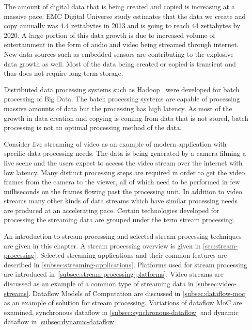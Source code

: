 The amount of digital data that is being created and copied is increasing at a massive pace. EMC Digital Universe study \cite{turner2014digital} estimates that the data we create and copy annually was 4.4 zettabytes in 2013 and is going to reach 44 zettabytes by 2020. A large portion of this data growth is due to increased volume of entertainment in the form of audio and video being streamed through internet. New data sources such as embedded sensors are contributing to the explosive data growth as well. Most of the data being created or copied is transient and thus does not require long term storage.~\cite{turner2014digital}

Distributed data processing systems such as Hadoop~\cite{white2012hadoop} were developed for batch processing of Big Data. The batch processing systems are capable of processing massive amounts of data but the processing has high latency. As most of the growth in data creation and copying is coming from data that is not stored, batch processing is not an optimal processing method of the data.

Consider live streaming of video as an example of modern application with specific data processing needs. The data is being generated by a camera filming a live scene and the users expect to access the video stream over the internet with low latency. Many distinct processing steps are required in order to get the video frames from the camera to the viewer, all of which need to be performed in few milliseconds on the frames flowing past the processing unit. In addition to video streams many other kinds of data streams which have similar processing needs are produced at an accelerating pace. Certain technologies developed for processing the streaming data are grouped under the term stream processing.

An introduction to stream processing and selected stream processing techniques are given in this chapter. A stream processing overview is given in \ref{sec:stream-processing}. Selected streaming applications and their common features are described in \ref{subsec:streaming-applications}. Platforms used for stream processing are introduced in~\ref{subsec:stream-processing-platforms}. Video streams are discussed as an example of a common type of streaming data in \ref{subsec:video-streams}. Dataflow Models of Computation are discussed in \ref{subsec:dataflow-moc} as an example of solution for stream processing. Variations of dataflow MoC are examined, synchronous dataflow in \ref{subsec:synchronous-dataflow} and dynamic dataflow in \ref{subsec:dynamic-dataflow}.
